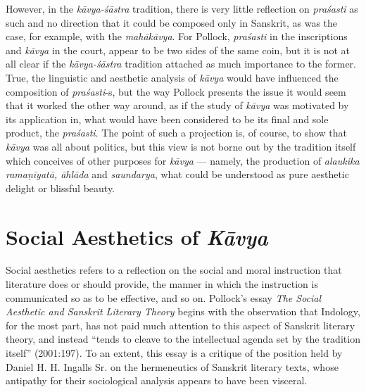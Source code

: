 However, in the \textsl{kāvya-śāstra} tradition, there is very little reflection on \textsl{praśasti} as such and no direction that it could be composed only in Sanskrit, as was the case, for example, with the \textsl{mahākāvya}. For Pollock, \textsl{praśasti} in the inscriptions and \textsl{kāvya} in the court, appear to be two sides of the same coin, but it is not at all clear if the \textsl{kāvya-śāstra} tradition attached as much importance to the former. True, the linguistic and aesthetic analysis of \textsl{kāvya} would have influenced the composition of \textsl{praśasti}-s, but the way Pollock presents the issue it would seem that it worked the other way around, as if the study of \textsl{kāvya} was motivated by its application in, what would have been considered to be its final and sole product, the \textsl{praśasti}. The point of such a projection is, of course, to show that \textsl{kāvya} was all about politics, but this view is not borne out by the tradition itself which conceives of other purposes for \textsl{kāvya} --- namely, the production of \textsl{alaukika ramaṇīyatā, āhlāda} and \textsl{saundarya}, what could be understood as pure aesthetic delight or blissful beauty.\\[-20pt]  

\section*{Social Aesthetics of {\sl\bfseries Kāvya}}

Social aesthetics refers to a reflection on the social and moral instruction that literature does or should provide, the manner in which the instruction is communicated so as to be effective, and so on. Pollock's essay \textsl{The Social Aesthetic and Sanskrit Literary Theory} begins with the observation that Indology, for the most part, has not paid much attention to this aspect of Sanskrit literary theory, and instead ``tends to cleave to the intellectual agenda set by the tradition itself'' (2001:197). To an extent, this essay is a critique of the position held by Daniel H. H. Ingalls Sr. on the hermeneutics of Sanskrit literary texts, whose antipathy for their sociological analysis appears to have been visceral. 

